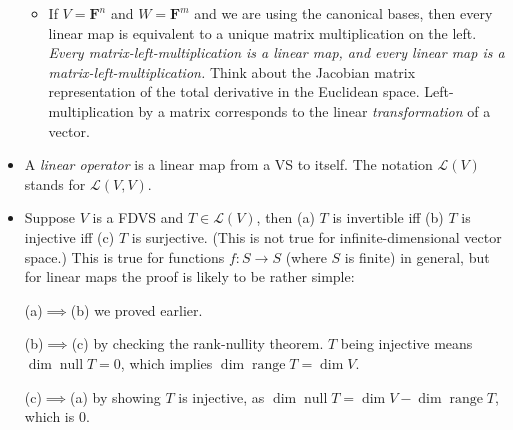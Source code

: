 \documentclass[11pt]{article}
\newcommand{\df}[1]{\textit{\textsf{#1}}}
\newcommand{\F}{\mathbf{F}}
\newcommand{\n}{\operatorname{null}}
\renewcommand{\r}{\operatorname{range}}
\renewcommand{\d}{\dim}
\newcommand{\LV}{\mathcal{L}(V)}
\begin{document}
\begin{itemize}
\begin{itemize}
        \item If $V = \F^n$ and $W = \F^m$ and we are using the canonical bases, then every linear map is equivalent to a unique matrix multiplication on the left. \emph{Every matrix-left-multiplication is a linear map, and every linear map is a matrix-left-multiplication.} Think about the Jacobian matrix representation of the total derivative in the Euclidean space. Left-multiplication by a matrix corresponds to the linear \emph{transformation} of a vector.
    \end{itemize}
    \item A \df{linear operator} is a linear map from a VS to itself. The notation $\LV$ stands for $\mathcal{L}(V,V)$.
    \item Suppose $V$ is a FDVS and $T \in \LV$, then (a) $T$ is invertible iff (b) $T$ is injective iff (c) $T$ is surjective. (This is not true for infinite-dimensional vector space.) This is true for functions $f:S \to S$ (where $S$ is finite) in general, but for linear maps the proof is likely to be rather simple:
        
    (a)$\implies$(b) we proved earlier.
        
    (b)$\implies$(c) by checking the rank-nullity theorem. $T$ being injective means $\d \n T = 0$, which implies $\d \r T = \d V$.
        
    (c)$\implies$(a) by showing $T$ is injective, as $\d \n T = \d V - \d \r T$, which is 0.
\end{itemize}
\end{document}
